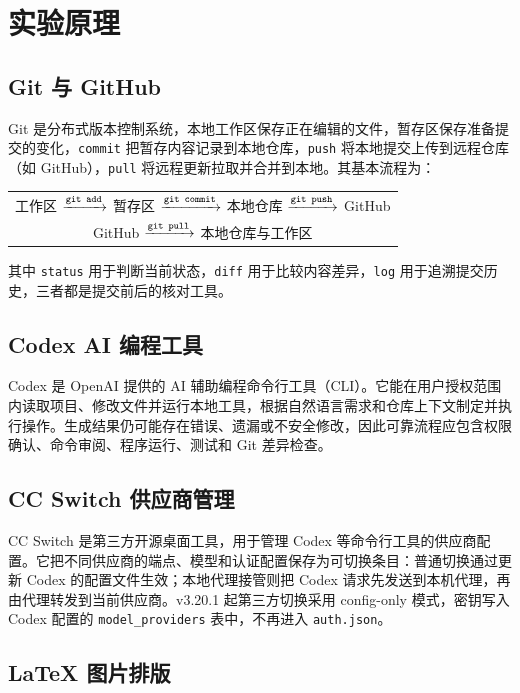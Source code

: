 \documentclass{SYSUReport}
\begin{document}
\section{实验原理}

\subsection{Git 与 GitHub}

Git 是分布式版本控制系统，本地工作区保存正在编辑的文件，暂存区保存准备提交的变化，\texttt{commit} 把暂存内容记录到本地仓库，\texttt{push} 将本地提交上传到远程仓库（如 GitHub），\texttt{pull} 将远程更新拉取并合并到本地。其基本流程为：

\begin{center}
\begin{tabular}{c}
工作区 $\xrightarrow{\text{\texttt{git add}}}$ 暂存区 $\xrightarrow{\text{\texttt{git commit}}}$ 本地仓库 $\xrightarrow{\text{\texttt{git push}}}$ GitHub \\
GitHub $\xrightarrow{\text{\texttt{git pull}}}$ 本地仓库与工作区
\end{tabular}
\end{center}

其中 \texttt{status} 用于判断当前状态，\texttt{diff} 用于比较内容差异，\texttt{log} 用于追溯提交历史，三者都是提交前后的核对工具。

\subsection{Codex AI 编程工具}

Codex 是 OpenAI 提供的 AI 辅助编程命令行工具（CLI）。它能在用户授权范围内读取项目、修改文件并运行本地工具，根据自然语言需求和仓库上下文制定并执行操作。生成结果仍可能存在错误、遗漏或不安全修改，因此可靠流程应包含权限确认、命令审阅、程序运行、测试和 Git 差异检查。

\subsection{CC Switch 供应商管理}

CC Switch 是第三方开源桌面工具，用于管理 Codex 等命令行工具的供应商配置。它把不同供应商的端点、模型和认证配置保存为可切换条目：普通切换通过更新 Codex 的配置文件生效；本地代理接管则把 Codex 请求先发送到本机代理，再由代理转发到当前供应商。v3.20.1 起第三方切换采用 config-only 模式，密钥写入 Codex 配置的 \texttt{model\_providers} 表中，不再进入 \texttt{auth.json}。

\subsection{LaTeX 图片排版}
\end{document}
